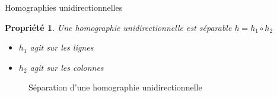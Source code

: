 \documentclass[c,12pt]{beamer}
\newtheorem{pte}{Propriété}
\begin{document}
\begin{frame}{Homographies unidirectionnelles}

\begin{pte}
Une homographie unidirectionnelle est séparable $h=h_1 \circ h_2$ 
\begin{itemize}
\item $h_1$ agit sur les lignes
\item $h_2$ agit sur les colonnes
\end{itemize}
\end{pte}

\begin{figure}
\centering
{}
\hfill
{}
\hfill
{}
\caption{Séparation d'une homographie unidirectionnelle}
\end{figure}

\end{frame}
\end{document}
